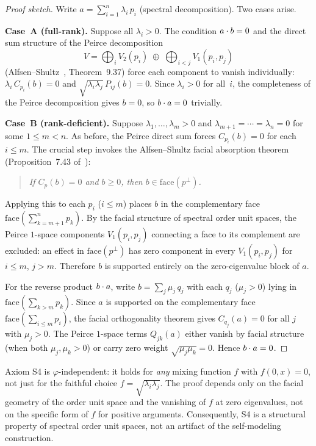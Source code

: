 \begin{proof}[Proof sketch]
Write $a = \sum_{i=1}^n \lambda_i\, p_i$ (spectral decomposition). Two
cases arise.

\medskip
\noindent\textbf{Case~A (full-rank).}
Suppose all $\lambda_i > 0$. The condition $\sp{a}{b} = 0$ and the direct
sum structure of the Peirce decomposition
\[
  V = \bigoplus_i V_2(p_i) \;\oplus\; \bigoplus_{i<j} V_1(p_i,p_j)
\]
(Alfsen--Shultz~\cite{AlfsenShultz2003}, Theorem~9.37)
force each component to vanish individually: $\lambda_i\, C_{p_i}(b) = 0$
and $\sqrt{\lambda_i\lambda_j}\, P_{ij}(b) = 0$. Since $\lambda_i > 0$
for all~$i$, the completeness of the Peirce decomposition gives $b = 0$,
so $\sp{b}{a} = 0$ trivially.

\medskip
\noindent\textbf{Case~B (rank-deficient).}
Suppose $\lambda_1,\ldots,\lambda_m > 0$ and
$\lambda_{m+1} = \cdots = \lambda_n = 0$ for some $1 \le m < n$. As
before, the Peirce direct sum forces $C_{p_i}(b) = 0$ for each $i \le m$.
The crucial step invokes the Alfsen--Shultz facial absorption theorem
(Proposition~7.43 of~\cite{AlfsenShultz2003}):
\begin{quote}
  \emph{If $C_p(b) = 0$ and $b \ge 0$, then
  $b \in \mathrm{face}(p^\perp)$.}
\end{quote}
Applying this to each $p_i$ ($i \le m$) places $b$ in the complementary
face $\mathrm{face}\!\left(\sum_{k=m+1}^n p_k\right)$. By the facial
structure of spectral order unit spaces, the Peirce $1$-space components
$V_1(p_i, p_j)$ connecting a face to its complement are excluded: an
effect in $\mathrm{face}(p^\perp)$ has zero component in every
$V_1(p_i,p_j)$ for $i\le m$, $j > m$. Therefore $b$ is supported
entirely on the zero-eigenvalue block of $a$.

For the reverse product $\sp{b}{a}$, write
$b = \sum_j \mu_j\, q_j$ with each $q_j$ ($\mu_j > 0$) lying in
$\mathrm{face}\!\left(\sum_{k>m} p_k\right)$. Since $a$ is supported on
the complementary face $\mathrm{face}\!\left(\sum_{i\le m}
p_i\right)$, the facial orthogonality theorem gives $C_{q_j}(a) = 0$ for
all $j$ with $\mu_j > 0$. The Peirce $1$-space terms $Q_{jk}(a)$ either
vanish by facial structure (when both $\mu_j,\mu_k>0$) or carry zero
weight $\sqrt{\mu_j\mu_k}=0$. Hence $\sp{b}{a} = 0$.
\end{proof}

\begin{remark}\label{rem:S4-phi-independent}
Axiom S4 is $\varphi$-independent: it holds for \emph{any} mixing
function $f$ with $f(0,x) = 0$, not just for the faithful choice
$f = \sqrt{\lambda_i\lambda_j}$. The proof depends only on the facial
geometry of the order unit space and the vanishing of $f$ at zero
eigenvalues, not on the specific form of $f$ for positive arguments.
Consequently, S4 is a structural property of spectral order unit spaces,
not an artifact of the self-modeling construction.
\end{remark}

